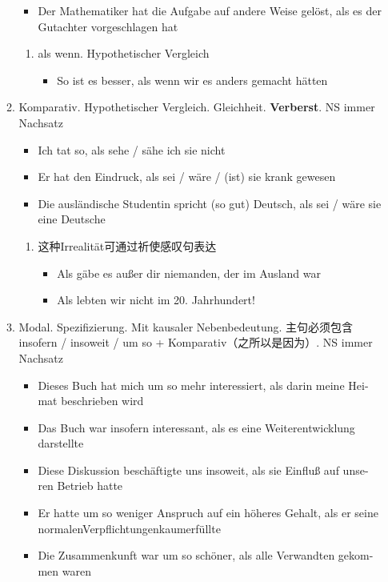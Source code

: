 \documentclass[UTF8]{report}
\begin{document}
\begin{enumerate}
\begin{enumerate}
\begin{itemize}
            \item Der Mathematiker hat die Aufgabe auf andere Weise gelöst, als es der Gutachter vorgeschlagen hat
        \end{itemize}
        \begin{enumerate}
            \item als wenn. Hypothetischer Vergleich
            \begin{itemize}
                \item So ist es besser, als wenn wir es anders gemacht hätten
            \end{itemize}
        \end{enumerate}
        \item Komparativ. Hypothetischer Vergleich. Gleichheit. \textbf{Verberst}. NS immer Nachsatz
        \begin{itemize}
            \item Ich tat so, als sehe / sähe ich sie nicht
            \item Er hat den Eindruck, als sei / wäre / (ist) sie krank gewesen
            \item Die ausländische Studentin spricht (so gut) Deutsch, als sei / wäre sie eine Deutsche
        \end{itemize}
        \begin{enumerate}
            \item 这种Irrealität可通过祈使感叹句表达
            \begin{itemize}
                \item Als gäbe es außer dir niemanden, der im Ausland war
                \item Als lebten wir nicht im 20. Jahrhundert!
            \end{itemize}
        \end{enumerate}
        \item Modal. Spezifizierung. Mit kausaler Nebenbedeutung. 主句必须包含insofern / insoweit / um so + Komparativ（之所以是因为）. NS immer Nachsatz
        \begin{itemize}
            \item Dieses Buch hat mich um so mehr interessiert, als darin meine Hei- mat beschrieben wird
            \item Das Buch war insofern interessant, als es eine Weiterentwicklung darstellte
            \item Diese Diskussion beschäftigte uns insoweit, als sie Einfluß auf unse- ren Betrieb hatte
            \item Er hatte um so weniger Anspruch auf ein höheres Gehalt, als er seine normalenVerpflichtungenkaumerfüllte
            \item Die Zusammenkunft war um so schöner, als alle Verwandten gekom- men waren
        \end{itemize}
    \end{enumerate}
\end{enumerate}
\end{document}
